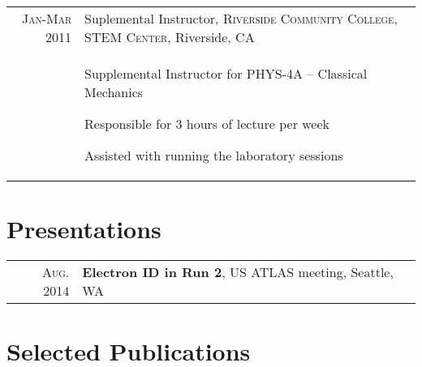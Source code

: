 \documentclass[a4paper,10pt]{article} %
\begin{document}
\begin{tabular}{r|p{11cm}}

\textsc{Jan-Mar 2011} & Suplemental Instructor, \textsc{Riverside Community College, STEM Center}, Riverside, CA \emph{}\\
		& \begin{itemize}
			\footnotesize{
				\item Supplemental Instructor for PHYS-4A – Classical Mechanics
				\item Responsible for 3 hours of lecture per week
   				\item Assisted with running the laboratory sessions
			}
          \end{itemize}
\end{tabular}


\section{Presentations}

\begin{tabular}{rl}
\textsc{Aug.} 2014  & \textbf{Electron ID in Run 2}, US ATLAS meeting, Seattle, WA \\
\end{tabular}



\section{Selected Publications}
\end{document}
